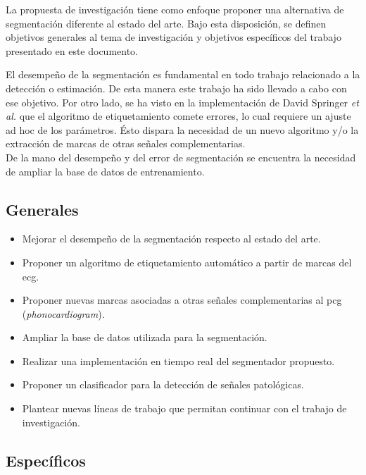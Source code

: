 La propuesta de investigación tiene como enfoque proponer una alternativa de segmentación diferente al estado del
arte. Bajo esta disposición, se definen objetivos generales al tema de investigación y objetivos específicos del
trabajo presentado en este documento. \bigskip

El desempeño de la segmentación es fundamental en todo trabajo relacionado a la detección o estimación. De esta
manera este trabajo ha sido llevado a cabo con ese objetivo.
Por otro lado, se ha visto en la implementación de David Springer \textit{et al.} \cite{pp:springer2015} que el
algoritmo de etiquetamiento comete errores, lo cual requiere un ajuste ad hoc de los parámetros. Ésto dispara la
necesidad de un nuevo algoritmo y/o la extracción de marcas de otras señales complementarias. \\
\indent De la mano del desempeño y del error de segmentación se encuentra la necesidad de ampliar la base de
datos de entrenamiento.

\subsection*{Generales} \label{subsec:general-objectives}

\begin{itemize}
  \item Mejorar el desempeño de la segmentación respecto al estado del arte.
  \item Proponer un algoritmo de etiquetamiento automático a partir de marcas del \acrshort{ecg}.
  \item Proponer nuevas marcas asociadas a otras señales complementarias al \acrshort{pcg} (\textit{phonocardiogram}).
  \item Ampliar la base de datos utilizada para la segmentación.
  \item Realizar una implementación en tiempo real del segmentador propuesto.
  \item Proponer un clasificador para la detección de señales patológicas.
  \item Plantear nuevas líneas de trabajo que permitan continuar con el trabajo de investigación.
\end{itemize}

\subsection*{Específicos} \label{subsec:specific-objectives}

